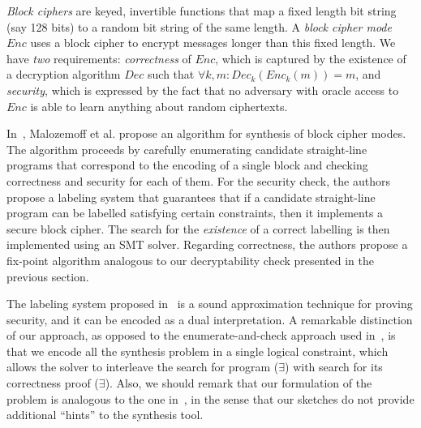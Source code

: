 \documentclass[preprint]{sig-alternate-05-2015}
\begin{document}
{\em{Block ciphers}} are keyed, invertible
functions that map a fixed length bit string (say 128 bits) to a random bit string
of the same length. A {\em{block cipher mode}} $Enc$ uses a block cipher to encrypt
messages longer than this fixed length. We have {\em{two}} requirements:
{\em{correctness}} of $Enc$, which is captured by the
existence of a decryption algorithm $Dec$ such that $\forall k, m : Dec_k(
Enc_k( m ) ) = m$, and {\em{security}}, which is expressed by the fact that no adversary with
oracle access to $Enc$ is able to learn anything about random ciphertexts.

In~\cite{DBLP:conf/csfw/MalozemoffKG14}, Malozemoff et al. propose
an algorithm for synthesis of block cipher modes.
The algorithm proceeds by carefully enumerating candidate straight-line programs
that correspond to the encoding of a single block and checking
correctness and security for each of them.
For the security check, the authors propose a 
labeling system that guarantees that if a candidate straight-line program
can be labelled satisfying certain constraints, 
then it implements a secure block cipher.
The search for the {\em existence} of a correct labelling
is then implemented using an SMT solver.
Regarding correctness, the authors propose a
fix-point algorithm analogous to our decryptability check presented in the previous
section.

The labeling system proposed in~\cite{DBLP:conf/csfw/MalozemoffKG14} is
a sound approximation technique for proving security,
and it can be encoded as a dual interpretation.
A remarkable distinction of our approach, as opposed to the
enumerate-and-check approach used in~\cite{DBLP:conf/csfw/MalozemoffKG14},
is that we encode all the synthesis problem in a single logical constraint,
which allows the solver to interleave the search for program ($\exists$)
with search for its correctness proof ($\exists$).
Also, we should remark that our formulation of the problem 
is analogous to the one in~\cite{DBLP:conf/csfw/MalozemoffKG14},
in the sense that our sketches do not provide 
additional ``hints'' to the synthesis tool.

\end{document}
